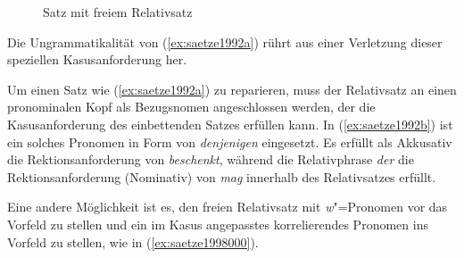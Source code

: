 \begin{figure}
  \centering
  \caption{Satz mit freiem Relativsatz}
  \label{fig:saetze1991b}
\end{figure}

Die Ungrammatikalität von (\ref{ex:saetze1992a}) rührt aus einer Verletzung dieser speziellen Kasusanforderung her.

\begin{exe}
\end{exe}

Um einen Satz wie (\ref{ex:saetze1992a}) zu reparieren, muss der Relativsatz an einen pronominalen Kopf als Bezugsnomen angeschlossen werden, der die Kasusanforderung des einbettenden Satzes erfüllen kann.
In (\ref{ex:saetze1992b}) ist ein solches Pronomen in Form von \textit{denjenigen} eingesetzt.
Es erfüllt als Akkusativ die Rektionsanforderung von \textit{beschenkt}, während die Relativphrase \textit{der} die Rektionsanforderung (Nominativ) von \textit{mag} innerhalb des Relativsatzes erfüllt.

\begin{exe}
\end{exe}

Eine andere Möglichkeit ist es, den freien Relativsatz mit \textit{w}"=Pronomen vor das Vorfeld zu stellen und ein im Kasus angepasstes korrelierendes Pronomen ins Vorfeld zu stellen, wie in (\ref{ex:saetze1998000}).

\begin{exe}
\end{exe}

